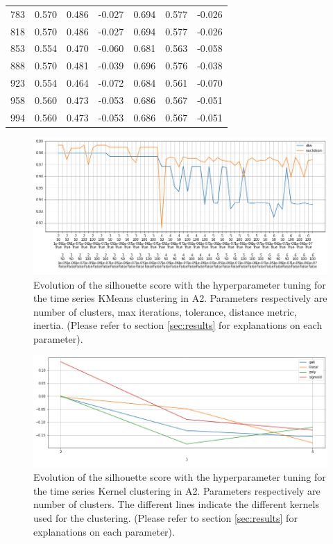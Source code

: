 \documentclass[sigplan,screen]{acmart}
\begin{document}
\begin{table}[h]
\begin{tabular}{cllllll}
      783 & 0.570 & 0.486 &-0.027 & 0.694 & 0.577 &-0.026\\
      818 & 0.570 & 0.486 &-0.027 & 0.694 & 0.577 &-0.026\\
      853 & 0.554 & 0.470 &-0.060 & 0.681 & 0.563 &-0.058\\
      888 & 0.570 & 0.481 &-0.039 & 0.696 & 0.576 &-0.038\\
      923 & 0.554 & 0.464 &-0.072 & 0.684 & 0.561 &-0.070\\
      958 & 0.560 & 0.473 &-0.053 & 0.686 & 0.567 &-0.051\\
      994 & 0.560 & 0.473 &-0.053 & 0.686 & 0.567 &-0.051\\
    \bottomrule
    \end{tabular}
\end{table}

\begin{figure}[h]
    \centering
    \includegraphics[width=\linewidth]{reports/figures/A2_clustering_german_kmeans.png}
    \caption{Evolution of the silhouette score with the hyperparameter tuning for the time series KMeans clustering in A2. Parameters respectively are number of clusters, max iterations, tolerance, distance metric, inertia. (Please refer to section \ref{sec:results} for explanations on each parameter).}
    \label{fig:A2_clustering_german_kmeans}
\end{figure}

\begin{figure}[h]
    \centering
    \includegraphics[width=\linewidth]{reports/figures/A2_clustering_math_kernel.png}
    \caption{Evolution of the silhouette score with the hyperparameter tuning for the time series Kernel clustering in A2. Parameters respectively are number of clusters. The different lines indicate the different kernels used for the clustering. (Please refer to section \ref{sec:results} for explanations on each parameter).}
    \label{fig:A2_clustering_math_kernel}
\end{figure}
\end{document}
